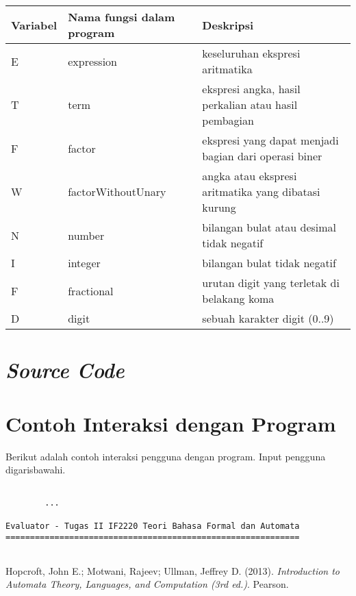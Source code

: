 \documentclass[a4paper,titlepage]{article}
\begin{document}
		\begin{table}[H]
			\centering
			\begin{tabular}{@{}lll@{}}
				\toprule
				Variabel & Nama fungsi dalam program & Deskripsi \\ \midrule
				E & expression 			& keseluruhan ekspresi aritmatika \\
				T & term 				& ekspresi angka, hasil perkalian atau hasil pembagian \\
				F & factor 				& ekspresi yang dapat menjadi bagian dari operasi biner \\
				W & factorWithoutUnary 	& angka atau ekspresi aritmatika yang dibatasi kurung \\
				N & number 				& bilangan bulat atau desimal tidak negatif \\
				I & integer 			& bilangan bulat tidak negatif \\
				F & fractional 			& urutan digit yang terletak di belakang koma \\
				D & digit 				& sebuah karakter digit (0..9) \\
			\end{tabular}
		\end{table}

	\section{\textit{Source Code}}

		

	\section{Contoh Interaksi dengan Program}

		Berikut adalah contoh interaksi pengguna dengan program. Input pengguna digarisbawahi.

		\begin{lstlisting}

		...
		
Evaluator - Tugas II IF2220 Teori Bahasa Formal dan Automata
============================================================


		\end{lstlisting}

	\begin{thebibliography}{9}

		Hopcroft, John E.; Motwani, Rajeev; Ullman, Jeffrey D.
		(2013).
		\textit{Introduction to Automata Theory, Languages, and Computation (3rd ed.)}.
		Pearson.

	\end{thebibliography}
\end{document}
